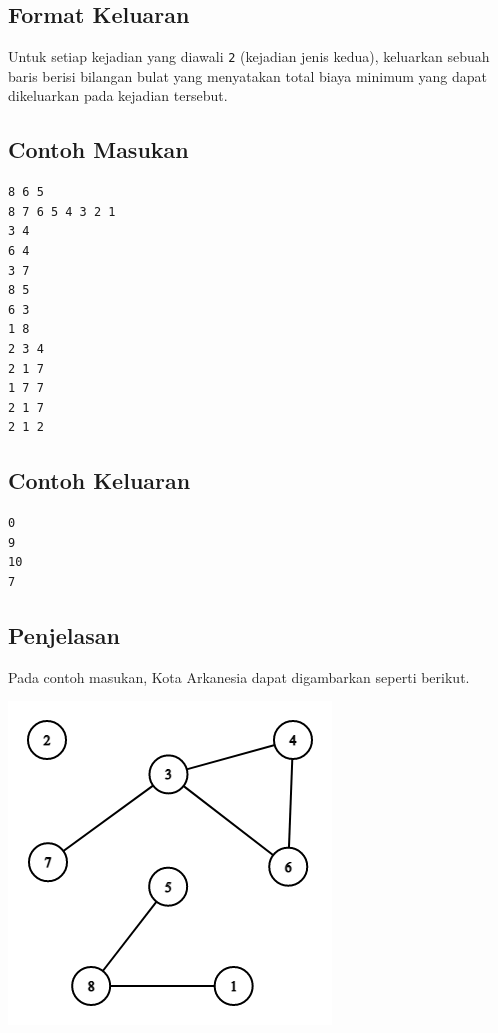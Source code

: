 \documentclass{article}
\begin{document}
\subsection*{Format Keluaran}
Untuk setiap kejadian yang diawali \verb|2| (kejadian jenis kedua), keluarkan sebuah baris berisi bilangan bulat yang menyatakan total biaya minimum yang dapat dikeluarkan pada kejadian tersebut.

\begin{multicols}{2}
\subsection*{Contoh Masukan}
\begin{lstlisting}
8 6 5
8 7 6 5 4 3 2 1
3 4
6 4
3 7
8 5
6 3
1 8
2 3 4
2 1 7
1 7 7
2 1 7
2 1 2
\end{lstlisting}
\null
\columnbreak

\subsection*{Contoh Keluaran}
\begin{lstlisting}
0
9
10
7
\end{lstlisting}
\vfill
\null
\end{multicols}

\subsection*{Penjelasan}
Pada contoh masukan, Kota Arkanesia dapat digambarkan seperti berikut.

\begin{center}
    \includegraphics[scale=0.4]{sample-graph.png}    
\end{center}
\end{document}
